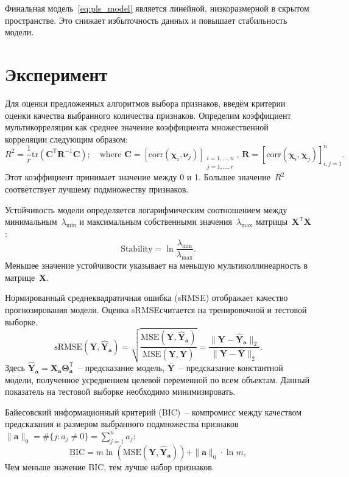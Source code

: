 \documentclass[preprint,12pt]{elsarticle}
\theoremstyle{definition}
\newcommand{\ba}{\mathbf{a}}
\newcommand{\bY}{\mathbf{Y}}
\newcommand{\bX}{\mathbf{X}}
\newcommand{\bC}{\mathbf{C}}
\newcommand{\T}{\mathsf{T}}
\newcommand{\bchi}{\boldsymbol{\chi}}
\newcommand{\bnu}{\boldsymbol{\nu}}
\newcommand{\bTheta}{\boldsymbol{\Theta}}
\begin{document}
Финальная модель~\eqref{eq:pls_model} является линейной, низкоразмерной в скрытом пространстве. 
Это снижает избыточность данных и повышает стабильность модели.

\section{Эксперимент}

Для оценки предложенных алгоритмов выбора признаков, введём критерии оценки качества выбранного количества признаков.
Определим коэффициент мультикорреляции как среднее значение коэффициента множественной корреляции следующим образом:
\begin{equation*}
R^2 = \frac{1}{r} \text{tr} \left( \bC^{\T} \mathbf{R}^{-1} \bC \right); \quad \text{where }\bC = [ \text{corr}(\bchi_i, \bnu_j)]_{\substack{i=1, \dots, n \\ j=1, \dots, r}}, \, \mathbf{R} = [ \text{corr}(\bchi_i, \bchi_j)]_{i, j = 1}^n.
\end{equation*}
Этот коэффициент принимает значение между 0 и 1. Большее значение~$R^2$ соответствует лучшему подмножеству признаков.

Устойчивость модели определяется логарифмическим соотношением между минимальным~$\lambda_{\min}$ и максимальным собственными значения~$\lambda_{\max}$ матрицы~$\bX^{\T} \bX$:
\begin{equation*}
\text{Stability} = \ln \frac{\lambda_{\min}}{\lambda_{\max}}.
\end{equation*}
Меньшее значение устойчивости указывает на меньшую мультиколлинеарность в матрице~$\bX$.

Нормированный среднеквадратичная ошибка (sRMSE) отображает качество прогнозирования модели. Оценка sRMSEсчитается на тренировочной и тестовой выборке.
\begin{equation*}
\text{sRMSE}(\bY, \widehat{\bY}_{\ba}) = \sqrt{\frac{\text{MSE} (\bY, \widehat{\bY}_{\ba})}{\text{MSE} (\bY, \overline{\bY})}} =  \frac{\| \bY - \widehat{\bY}_{\ba} \|_2}{\| \bY - \overline{\bY} \|_2}.
\end{equation*}
Здесь $\widehat{\bY}_{\ba} = \bX_{\ba} \bTheta_{\ba}^{\T}$~-- предсказание модель, $\overline{\bY}$~-- предсказание константной модели, полученное усреднением целевой переменной по всем объектам.
Данный показатель на тестовой выборке необходимо минимизировать.

Байесовский информационный критерий (BIC)~-- компромисс между качеством предсказания и размером выбранного подмножества признаков~$\|\ba\|_0 = \#\{j: a_j \neq 0\}= \sum_{j=1}^n a_j$:
\begin{equation*}
\text{BIC} = m \ln \left( \text{MSE} ( \bY, \widehat{\bY}_{\ba})\right) + \| \ba \|_0 \cdot \ln m,
\end{equation*}
Чем меньше значение BIC, тем лучше набор признаков.
\end{document}

